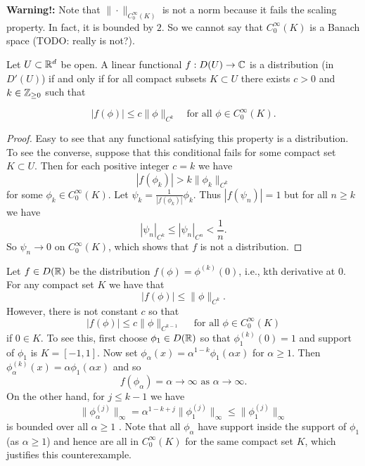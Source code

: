 \documentclass[twoside, a4paper, 10pt]{amsart}
\begin{document}
\begin{remark} \textbf{Warning!:} Note that $\|\cdot \|_{C_0^{\infty}(K)}$ is not a norm because it fails the scaling property. In fact, it is bounded by $2$. So we cannot say that $C_0^{\infty}(K)$ is a Banach space (TODO: really is not?).

\end{remark}

\begin{thm} \label{thm: distributions are lipschitz on compact sets} Let $U \subset \mathbb{R}^d$ be open. A linear functional $f:D(U) \to \mathbb{C}$ is a distribution (in $D'(U)$) if and only if for all compact subsets $K \subset U$ there exists $c>0$ and $k \in \mathbb{Z}_{\geq 0}$ such that

$$ |f(\phi)| \leq c \|\phi\|_{C^k} \quad \text{for all } \phi \in C_0^{\infty}(K).$$

\end{thm}

\begin{proof} Easy to see that any functional satisfying this property is a distribution. To see the converse, suppose that this conditional fails for some compact set $K \subset U$. Then for each positive integer $c = k$ we have $$|f(\phi_k)| > k \|\phi_k\|_{C^k}$$ for some $\phi_k \in C_0^{\infty}(K)$. Let $\psi_k = \frac{1}{|f(\phi_k)|} \phi_k$. Thus $|f(\psi_n)| = 1$ but for all $n \geq k$ we have $$|\psi_n|_{C^k} \leq |\psi_n|_{C^n} < \frac{1}{n}.$$ So $\psi_n \to 0$ on $C_0^{\infty}(K)$, which shows that $f$ is not a distribution. \end{proof}

\begin{eg} Let $f \in D(\mathbb{R})$ be the distribution $f(\phi) = \phi^{(k)}(0)$, i.e., kth derivative at $0$. For any compact set $K$ we have that $$|f(\phi)| \leq \| \phi \|_{C^k}.$$ However, there is not constant $c$ so that $$|f(\phi)| \leq c\| \phi \|_{C^{k-1}} \quad\text{ for all } \phi \in C_{0}^{\infty}(K)$$ if $0 \in K$. To see this, first choose $\phi_1 \in D(\mathbb{R})$ so that $\phi_1^{(k)}(0) = 1$ and support of $\phi_1$ is $K = [-1,1]$. Now set $\phi_{\alpha}(x) = \alpha^{1-k} \phi_1(\alpha x)$ for $\alpha \geq 1$. Then $\phi_{\alpha}^{(k)}(x) = \alpha \phi_1(\alpha x)$ and so $$f(\phi_{\alpha}) = \alpha \to \infty \text{ as } \alpha \to \infty.$$ On the other hand, for $j\leq k-1$ we have $$\|\phi_{\alpha}^{(j)}\|_{\infty} = \alpha^{1-k+j}\|\phi_1^{(j)} \|_{\infty} \leq \|\phi_1^{(j)} \|_{\infty}$$ is bounded over all $\alpha \geq 1$ . Note that all $\phi_{\alpha}$ have support inside the support of $\phi_1$ (as $\alpha \geq 1$) and hence are all in $C_0^{\infty}(K)$ for the same compact set $K$, which justifies this counterexample. \end{eg}
\end{document}
